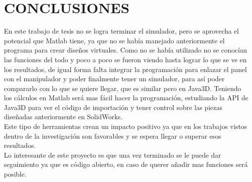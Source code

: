 \renewcommand\thechapter{\Roman{chapter}}
\chapter{CONCLUSIONES} \label{ch:conclusiones} \thispagestyle{fancy}
\renewcommand\thechapter{\arabic{chapter}}
En este trabajo de tesis no se logra terminar el simulador, pero se aprovecha el potencial que Matlab tiene, ya que no se había manejado anteriormente el programa para crear diseños virtuales. Como no se había utilizado no se conocían las funciones del todo y poco a poco se fueron viendo hasta lograr lo que se ve en los resultados, de igual forma falta integrar la programación para enlazar el panel con el manipulador y poder finalmente tener un simulador, para así poder compararlo con lo que se quiere llegar, que es similar pero en Java3D. Teniendo los cálculos en Matlab será mas fácil hacer la programación, estudiando la API de Java3D para ver el código de importación y tener control sobre las piezas diseñadas anteriormente en SolidWorks.\\

Este tipo de herramientas crean un impacto positivo ya que en los trabajos vistos dentro de la investigación son favorables y se espera llegar o superar esos resultados.\\

Lo interesante de este proyecto es que una vez terminado se le puede dar seguimiento ya que es  código abierto, en caso de querer añadir mas funciones será posible.